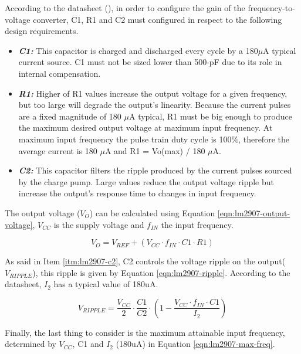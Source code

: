 			According to the datasheet (\cite{lm2907-datasheet}), in order to configure the gain of the frequency-to-voltage converter, C1, R1 and C2 must configured in respect to the following design requirements.

			\begin{itemize}
				\item\textbf{\textit{C1:}} This capacitor is charged and discharged every cycle by a 180$\mu$A typical current source. C1 must not be sized lower than 500-pF due to its role in internal compensation.\label{itm:lm2907-c1}
				\item\textbf{\textit{R1:}} Higher of R1 values increase the output voltage for a given frequency, but too large will degrade the output’s linearity. Because the current pulses are a fixed magnitude of 180 $\mu$A  typical, R1 must be big enough to produce the maximum desired output voltage at maximum input frequency. At maximum input frequency the pulse train duty cycle is 100$\%$, therefore the average current is 180 $\mu$A and R1 = Vo(max) / 180 $\mu$A.\label{itm:lm2907-r1}
				\item\textbf{\textit{C2:}} This capacitor filters the ripple produced by the current pulses sourced by the charge pump. Large values reduce the output voltage ripple but increase the output’s response time to changes in input frequency.\label{itm:lm2907-c2}
			\end{itemize}

			The output voltage ($V_{O}$) can be calculated using Equation \ref{eqn:lm2907-output-voltage}, $V_{CC}$ is the supply voltage and $f_{IN}$ the input frequency.

			\begin{equation}\label{eqn:lm2907-output-voltage}
				V_{O}=V_{REF} + \left( V_{CC} \cdot f_{IN} \cdot C1 \cdot R1 \right)
			\end{equation}

			As said in Item \ref{itm:lm2907-c2}, C2 controls the voltage ripple on the output($V_{RIPPLE}$), this ripple is given by Equation \ref{eqn:lm2907-ripple}. According to the datasheet, $I_{2}$ has a typical value of 180uA.

			\begin{equation}\label{eqn:lm2907-ripple}
				V_{RIPPLE}=\frac{V_{CC}}{2} \cdot \frac{C1}{C2} \cdot \left( 1 - \frac{V_{CC} \cdot f_{IN} \cdot C1}{I_{2}} \right)
			\end{equation}

			Finally, the last thing to consider is the maximum attainable input frequency, determined by $V_{CC}$, C1 and $I_{2}$ (180uA) in Equation \ref{eqn:lm2907-max-freq}.

